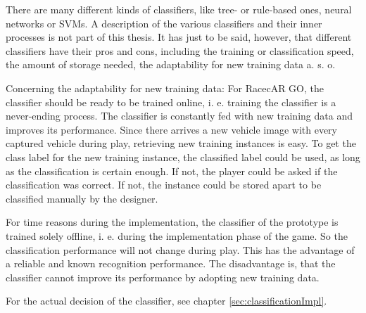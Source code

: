 There are many different kinds of classifiers, like tree- or rule-based ones, neural networks or SVMs. A description of the various classifiers and their inner processes is not part of this thesis. It has just to be said, however, that different classifiers have their pros and cons, including the training or classification speed, the amount of storage needed, the adaptability for new training data a. s. o.

Concerning the adaptability for new training data: For RacecAR GO, the classifier should be ready to be trained online, i. e. training the classifier is a never-ending process. The classifier is constantly fed with new training data and improves its performance. Since there arrives a new vehicle image with every captured vehicle during play, retrieving new training instances is easy. To get the class label for the new training instance, the classified label could be used, as long as the classification is certain enough. If not, the player could be asked if the classification was correct. If not, the instance could be stored apart to be classified manually by the designer.

For time reasons during the implementation, the classifier of the prototype is trained solely offline, i. e. during the implementation phase of the game. So the classification performance will not change during play. This has the advantage of a reliable and known recognition performance. The disadvantage is, that the classifier cannot improve its performance by adopting new training data.

For the actual decision of the classifier, see chapter \ref{sec:classificationImpl}.

